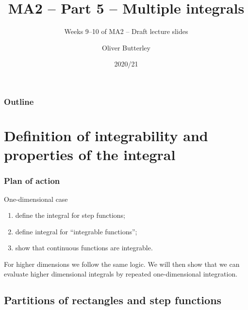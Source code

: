 \documentclass[aspectratio=169,handout]{beamer}
\title{MA2 -- Part 5 -- Multiple integrals}
\subtitle{Weeks 9--10 of MA2 -- Draft lecture slides}
\author[]{Oliver Butterley}
\institute{University of Rome Tor Vergata}
\date{2020/21}
\begin{document}
\frame{\titlepage}

\begin{frame}
    \frametitle{Outline}
    \tableofcontents
\end{frame}

\section{Definition of integrability and properties of the integral}

\begin{frame}
    \frametitle{Plan of action}
    One-dimensional case
    \begin{enumerate}
        \item define the integral for step functions;
        \item define integral for ``integrable functions'';
        \item  show that continuous functions are integrable.
    \end{enumerate}

    For higher dimensions we follow the same logic. We will then show that we can evaluate higher dimensional integrals by repeated one-dimensional integration.



\end{frame}


\subsection{Partitions of rectangles and step functions}
\end{document}

